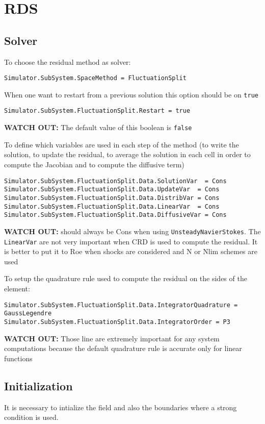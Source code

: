 \documentclass[11pt]{article}
\begin{document}
\section{RDS}
\subsection{Solver}
To choose the residual method as solver:
\begin{verbatim}
Simulator.SubSystem.SpaceMethod = FluctuationSplit
\end{verbatim}
When one want to restart from a previous solution this option should be on \texttt{true} 
\begin{verbatim}
Simulator.SubSystem.FluctuationSplit.Restart = true
\end{verbatim}
{\bf WATCH OUT:} The default value of this boolean is \texttt{false}


To define which variables are used in each step of the method (to write the solution, to update the 
residual, to average the solution in each cell in order to compute the Jacobian and to compute the diffusive term)
\begin{verbatim}
Simulator.SubSystem.FluctuationSplit.Data.SolutionVar  = Cons
Simulator.SubSystem.FluctuationSplit.Data.UpdateVar  = Cons
Simulator.SubSystem.FluctuationSplit.Data.DistribVar = Cons
Simulator.SubSystem.FluctuationSplit.Data.LinearVar  = Cons
Simulator.SubSystem.FluctuationSplit.Data.DiffusiveVar = Cons
\end{verbatim}
{\bf WATCH OUT:}  should always be Cons when using \texttt{UnsteadyNavierStokes}. The
\texttt{LinearVar} are not very important when CRD \cite{mr-thesis} is used to compute the residual. It is better to put it to Roe when
shocks are considered and N or Nlim schemes are used

To setup the quadrature rule used to compute the residual on the sides of the element:
\begin{verbatim}
Simulator.SubSystem.FluctuationSplit.Data.IntegratorQuadrature = GaussLegendre
Simulator.SubSystem.FluctuationSplit.Data.IntegratorOrder = P3
\end{verbatim}
{\bf WATCH OUT:} Those line are extremely important for any system computations because the 
default quadrature rule is accurate only for linear functions

\subsection{Initialization}
It is necessary to intialize the field and also the boundaries 
where a strong condition is used.
\end{document}
